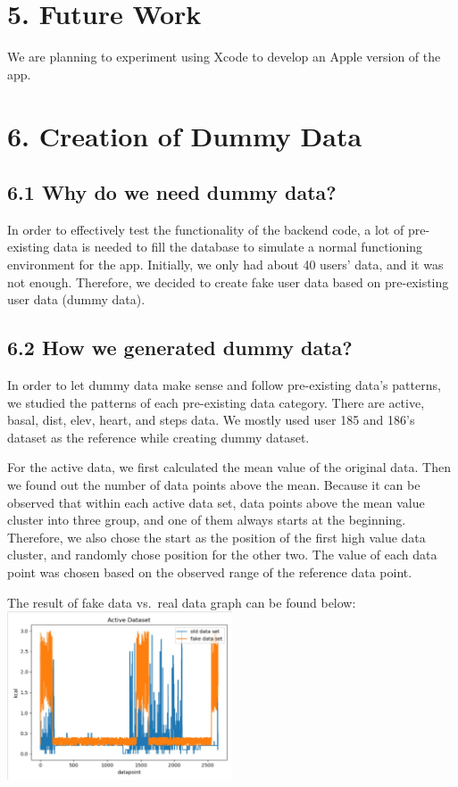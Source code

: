 \documentclass[]{book}
\begin{document}
\section{5. Future Work}\label{future-work-1}

We are planning to experiment using Xcode to develop an Apple version of
the app.

\section{6. Creation of Dummy Data}\label{creation-of-dummy-data-1}

\subsection{6.1 Why do we need dummy
data?}\label{why-do-we-need-dummy-data-1}

In order to effectively test the functionality of the backend code, a
lot of pre-existing data is needed to fill the database to simulate a
normal functioning environment for the app. Initially, we only had about
40 users' data, and it was not enough. Therefore, we decided to create
fake user data based on pre-existing user data (dummy data).

\subsection{6.2 How we generated dummy
data?}\label{how-we-generated-dummy-data-1}

In order to let dummy data make sense and follow pre-existing data's
patterns, we studied the patterns of each pre-existing data category.
There are active, basal, dist, elev, heart, and steps data. We mostly
used user 185 and 186's dataset as the reference while creating dummy
dataset.

For the active data, we first calculated the mean value of the original
data. Then we found out the number of data points above the mean.
Because it can be observed that within each active data set, data points
above the mean value cluster into three group, and one of them always
starts at the beginning. Therefore, we also chose the start as the
position of the first high value data cluster, and randomly chose
position for the other two. The value of each data point was chosen
based on the observed range of the reference data point.

The result of fake data vs.~real data graph can be found below:\\
\includegraphics[width=0.50000\textwidth]{./images/Active Data.JPG}
\end{document}
